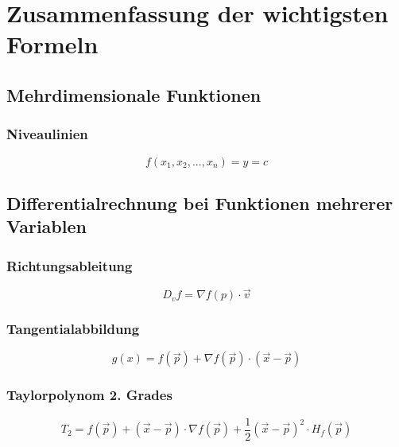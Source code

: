 \documentclass[a4paper,11pt]{article}
\begin{document}
	\pagebreak
	
	\section{Zusammenfassung der wichtigsten Formeln} %
	\label{sec:zusammenfassung_der_wichtigsten_formeln}
	
	\subsection{Mehrdimensionale Funktionen}
	\label{sub:mehrdimensionale_funktionen}
	\subsubsection{Niveaulinien} 
	\label{ssub:niveaulinien}
	\begin{equation}
		f(x_1,x_2,...,x_n) = y = c
	\end{equation}	
	
	\subsection{Differentialrechnung bei Funktionen mehrerer Variablen}
	\label{sub:differentialrechnung_bei_funktionen_mehrerer_variablen}
	\subsubsection{Richtungsableitung} 
	\label{ssub:richtungsableitung}
	\begin{equation}
		D_vf = \nabla f(p) \cdot \overrightarrow{v}
	\end{equation}	
	\subsubsection{Tangentialabbildung}
	\label{ssub:tangentialabbildung}
	\begin{equation}
		g(x) = f(\overrightarrow{p}) + \nabla f(\overrightarrow{p})\cdot(\overrightarrow{x}-\overrightarrow{p})
	\end{equation}	
	\subsubsection{Taylorpolynom 2. Grades}
	\label{ssub:taylorpolynom_2_grades}
	\begin{equation}
		T_2 = f(\overrightarrow{p}) + (\overrightarrow{x}-\overrightarrow{p}) \cdot \nabla f(\overrightarrow{p})+\frac{1}{2}
		(\overrightarrow{x}-\overrightarrow{p})^2 \cdot H_f(\overrightarrow{p})
	\end{equation}
\end{document}
